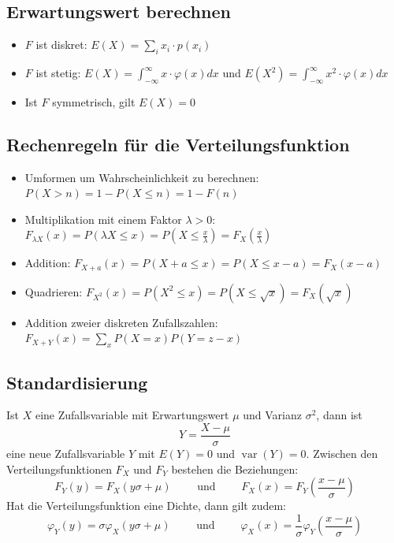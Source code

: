 \subsection{Erwartungswert berechnen}
\begin{itemize}
  \item $F$ ist diskret: $E(X) = \sum_i x_i \cdot p(x_i)$ %
  \item $F$ ist stetig: $E(X) = \int_{-\infty}^{\infty}x \cdot \varphi(x)dx$
    und $E(X^2) = \int_{-\infty}^{\infty}x^2 \cdot \varphi(x)dx$
  \item Ist $F$ symmetrisch, gilt $E(X) = 0$
\end{itemize}

\subsection{Rechenregeln für die Verteilungsfunktion}
\begin{itemize}
  \item Umformen um Wahrscheinlichkeit zu berechnen:
    $P(X>n) = 1 - P(X \le n) = 1 - F(n)$
  \item Multiplikation mit einem Faktor $\lambda > 0$: $F_{\lambda X}(x)=
    P(\lambda X \le x) = P(X \le \frac{x}{\lambda}) =
    F_X(\frac{x}{\lambda})$
  \item Addition: $F_{X+a}(x) = P(X+a \le x) = P(X \le x-a) = F_X(x-a)$
  \item Quadrieren: $F_{X^2}(x) = P(X^2 \le x) = P(X \le \sqrt{x}) =
    F_X(\sqrt{x})$
  \item Addition zweier diskreten Zufallszahlen:
    $F_{X+Y}(x) = \sum_x P(X=x)P(Y=z-x)$
\end{itemize}

\subsection{Standardisierung}
Ist $X$ eine Zufallsvariable mit Erwartungswert $\mu$ und Varianz
$\sigma^2$, dann ist
\[ Y = \frac{X-\mu}{\sigma} \]
eine neue Zufallsvariable $Y$ mit $E(Y) = 0$ und $\operatorname{var}(Y) = 0$.
Zwischen den Verteilungsfunktionen $F_X$ und $F_Y$ bestehen die
Beziehungen:
\[ F_Y(y) = F_X(y\sigma+\mu) \qquad \text{ und } \qquad
  F_X(x)=F_Y\left(\frac{x-\mu}{\sigma}\right) \]
Hat die Verteilungsfunktion eine Dichte, dann gilt zudem:
\[ \varphi_Y(y) = \sigma \varphi_X(y\sigma+\mu) \qquad \text{ und }
  \qquad \varphi_X(x) = \frac{1}{\sigma}
  \varphi_Y\left(\frac{x-\mu}\sigma\right) \]

